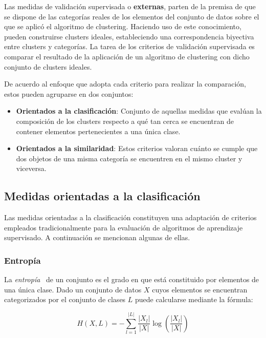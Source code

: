 Las medidas de validación supervisada o \textbf{externas}, parten de la premisa de que se dispone de las categorías reales de los elementos del conjunto de datos sobre el que se aplicó el algoritmo de clustering.
Haciendo uso de este conocimiento, pueden construirse clusters ideales, estableciendo una correspondencia biyectiva entre clusters y categorías.
La tarea de los criterios de validación supervisada es comparar el resultado de la aplicación de un algoritmo de clustering con dicho conjunto de clusters ideales.

De acuerdo al enfoque que adopta cada criterio para realizar la comparación, estos pueden agruparse en dos conjuntos:

\begin{itemize}
    \item \textbf{Orientados a la clasificación}: Conjunto de aquellas medidas que evalúan la composición de los clusters respecto a qué tan cerca se encuentran de contener elementos pertenecientes a una única clase.
    \item \textbf{Orientados a la similaridad}: Estos criterios valoran cuánto se cumple que dos objetos de una misma categoría se encuentren en el mismo cluster y viceversa.
\end{itemize}

\subsection{Medidas orientadas a la clasificación}\label{subsec:medidasOrientadasALaClasificación}

Las medidas orientadas a la clasificación constituyen una adaptación de criterios empleados tradicionalmente para la evaluación de algoritmos de aprendizaje supervisado.
A continuación se mencionan algunas de ellas.

\subsubsection{Entropía}

La \textit{entropía}~\cite{Tan05,Wagner07} de un conjunto es el grado en que está constituido por elementos de una única clase.
Dado un conjunto de datos $X$ cuyos elementos se encuentran categorizados por el conjunto de clases $L$ puede calcularse mediante la fórmula:

\begin{equation}
    \label{eq:entropy}
    H(X, L) = -\sum_{l=1}^{|L|}{\frac{|X_l|}{|X|}\log{\left( \frac{|X_l|}{|X|} \right)}}
\end{equation}

